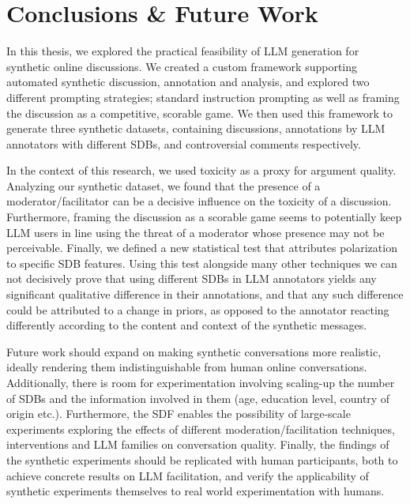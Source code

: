 %
\chapter{Conclusions \& Future Work}
\label{sec:conclusions}

In this thesis, we explored the practical feasibility of LLM generation for synthetic online discussions. We created a custom framework supporting automated synthetic discussion, annotation and analysis, and explored two different prompting strategies; standard instruction prompting as well as framing the discussion as a competitive, scorable game. We then used this framework to generate three synthetic datasets, containing discussions, annotations by LLM annotators with different \acp{SDB}, and controversial comments respectively. 

In the context of this research, we used toxicity as a proxy for argument quality. Analyzing our synthetic dataset, we found that the presence of a moderator/facilitator can be a decisive influence on the toxicity of a discussion. Furthermore, framing the discussion as a scorable game seems to potentially keep LLM users in line using the threat of a moderator whose presence may not be perceivable. Finally, we defined a new statistical test that attributes polarization to specific \ac{SDB} features. Using this test alongside many other techniques we can not decisively prove that using different \acp{SDB} in LLM annotators yields any significant qualitative difference in their annotations, and that any such difference could be attributed to a change in priors, as opposed to the annotator reacting differently according to the content and context of the synthetic messages.

Future work should expand on making synthetic conversations more realistic, ideally rendering them indistinguishable from human online conversations. Additionally, there is room for experimentation involving scaling-up the number of \acp{SDB} and the information involved in them (age, education level, country of origin etc.). Furthermore, the \ac{SDF} enables the possibility of large-scale experiments exploring the effects of different moderation/facilitation techniques, interventions and LLM families on conversation quality. Finally, the findings of the synthetic experiments should be replicated with human participants, both to achieve concrete results on LLM facilitation, and verify the applicability of synthetic experiments themselves to real world experimentation with humans.